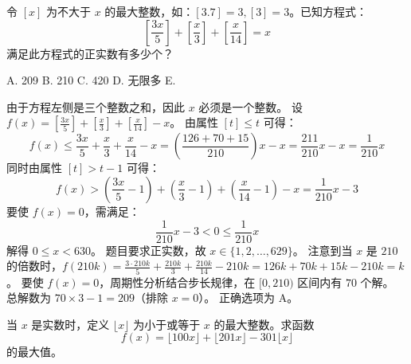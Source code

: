 \begin{questions}

    \question 令 $[x]$ 为不大于 $x$ 的最大整数，如：$[3.7]=3, [3]=3$。已知方程式：
\[ \left[ \frac{3x}{5} \right] + \left[ \frac{x}{3} \right] + \left[ \frac{x}{14} \right] = x \]
满足此方程式的正实数有多少个？

A. 209 \quad B. 210 \quad C. 420 \quad D. 无限多 \quad E. 

\begin{solution}
由于方程左侧是三个整数之和，因此 $x$ 必须是一个整数。
设 $f(x) = \left[ \frac{3x}{5} \right] + \left[ \frac{x}{3} \right] + \left[ \frac{x}{14} \right] - x$。
由属性 $[t] \le t$ 可得：
\[ f(x) \le \frac{3x}{5} + \frac{x}{3} + \frac{x}{14} - x = \left( \frac{126+70+15}{210} \right)x - x = \frac{211}{210}x - x = \frac{1}{210}x \]
同时由属性 $[t] > t - 1$ 可得：
\[ f(x) > \left( \frac{3x}{5} - 1 \right) + \left( \frac{x}{3} - 1 \right) + \left( \frac{x}{14} - 1 \right) - x = \frac{1}{210}x - 3 \]
要使 $f(x) = 0$，需满足：
\[ \frac{1}{210}x - 3 < 0 \le \frac{1}{210}x \]
解得 $0 \le x < 630$。
题目要求正实数，故 $x \in \{1, 2, \dots, 629\}$。
注意到当 $x$ 是 $210$ 的倍数时，$f(210k) = \frac{3 \cdot 210k}{5} + \frac{210k}{3} + \frac{210k}{14} - 210k = 126k + 70k + 15k - 210k = k$。
要使 $f(x)=0$，周期性分析结合步长规律，在 $[0, 210)$ 区间内有 $70$ 个解。
总解数为 $70 \times 3 - 1 = 209$（排除 $x=0$）。
正确选项为 A。
\end{solution}

    \question 当 $x$ 是实数时，定义 $\lfloor x \rfloor$ 为小于或等于 $x$ 的最大整数。求函数
\[
f(x) = \lfloor 100x \rfloor + \lfloor 201x \rfloor - 301\lfloor x \rfloor
\]
的最大值。


\end{questions}
